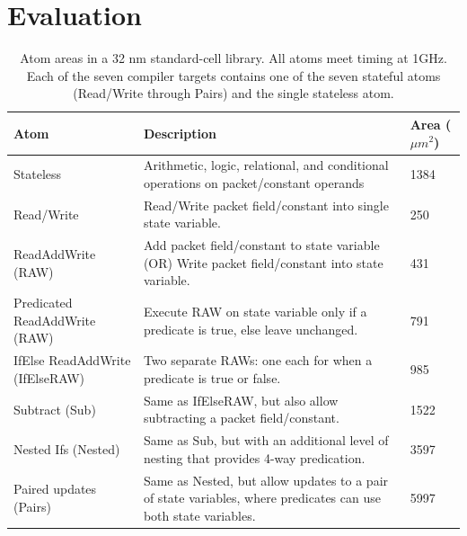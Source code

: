 \section{Evaluation}
\label{s:eval}

\begin{table}[!t]
  \begin{scriptsize}
  \begin{tabular}{|p{}|p{}|p{}|}
    \hline
    Atom & Description & Area ($\mu m^2$)\\
    \hline
    Stateless & Arithmetic, logic, relational, and conditional operations on packet/constant operands & 1384 \\
    \hline
    Read/Write & Read/Write packet field/constant into single state variable. & 250 \\
    \hline
    ReadAddWrite (RAW) & Add packet field/constant to state variable (OR) Write packet field/constant into state variable. & 431 \\
    \hline
    Predicated ReadAddWrite (RAW) & Execute RAW on state variable only if a predicate is true, else leave unchanged. & 791 \\
    \hline
    IfElse ReadAddWrite (IfElseRAW) & Two separate RAWs: one each for when a predicate is true or false. & 985 \\
    \hline
    Subtract (Sub) & Same as IfElseRAW, but also allow subtracting a packet field/constant. & 1522 \\
    \hline
    Nested Ifs (Nested) & Same as Sub, but with an additional level of nesting that provides 4-way predication. & 3597 \\
    \hline
    Paired updates (Pairs) & Same as Nested, but allow updates to a pair of state variables, where predicates can use both state variables. & 5997 \\
    \hline
  \end{tabular}
  \end{scriptsize}
  \caption{Atom areas in a 32 nm standard-cell library.  All atoms meet timing
  at 1GHz. Each of the seven compiler targets contains one of the seven
  stateful atoms (Read/Write through Pairs) and the single stateless atom.}
  \label{tab:templates}
\end{table}

